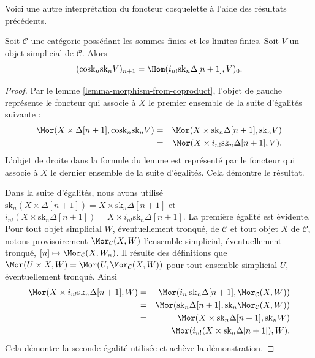 \noindent
Voici une autre interprétation du foncteur cosquelette à l'aide des
résultats précédents.

\begin{lemma}
\label{lemma-cosk-shriek}
Soit $\mathcal{C}$ une catégorie possédant les sommes finies et les
limites finies. Soit $V$ un objet simplicial de $\mathcal{C}$. Alors
$$
(\text{cosk}_n \text{sk}_n V)_{n + 1}
=
\Hom(i_{n !}\text{sk}_n \Delta[n + 1], V)_0.
$$
\end{lemma}

\begin{proof}
Par le lemme \ref{lemma-morphism-from-coproduct}, l'objet de gauche
représente le foncteur qui associe à $X$ le premier ensemble de la suite
d'égalités suivante :
\begin{eqnarray*}
\Mor(X \times \Delta[n + 1], \text{cosk}_n \text{sk}_n V)
& = &
\Mor(X \times \text{sk}_n \Delta[n + 1], \text{sk}_n V) \\
& = &
\Mor(X \times i_{n !} \text{sk}_n \Delta[n + 1], V).
\end{eqnarray*}
L'objet de droite dans la formule du lemme est représenté par le foncteur
qui associe à $X$ le dernier ensemble de la suite d'égalités. Cela démontre
le résultat.

\medskip\noindent
Dans la suite d'égalités, nous avons utilisé
$\text{sk}_n (X \times \Delta[n + 1]) = X \times \text{sk}_n \Delta[n + 1]$
et
$i_{n!}(X \times \text{sk}_n \Delta[n + 1]) =
X \times i_{n !} \text{sk}_n \Delta[n + 1]$.
La première égalité est évidente. Pour tout objet simplicial $W$,
éventuellement tronqué, de $\mathcal{C}$ et tout objet $X$ de
$\mathcal{C}$, notons provisoirement $\Mor_\mathcal{C}(X, W)$ l'ensemble
simplicial, éventuellement tronqué,
$[n] \mapsto \Mor_\mathcal{C}(X, W_n)$. Il résulte des définitions que
$\Mor(U \times X, W) =
\Mor(U, \Mor_\mathcal{C}(X, W))$ pour tout ensemble simplicial $U$,
éventuellement tronqué. Ainsi
\begin{eqnarray*}
\Mor(X \times i_{n !} \text{sk}_n \Delta[n + 1], W)
& = &
\Mor(i_{n !} \text{sk}_n \Delta[n + 1], \Mor_\mathcal{C}(X, W)) \\
& = &
\Mor(\text{sk}_n \Delta[n + 1],
\text{sk}_n\Mor_\mathcal{C}(X, W)) \\
& = &
\Mor(X \times \text{sk}_n \Delta[n + 1], \text{sk}_nW) \\
& = &
\Mor(i_{n!}(X \times \text{sk}_n \Delta[n + 1]), W).
\end{eqnarray*}
Cela démontre la seconde égalité utilisée et achève la démonstration.
\end{proof}




